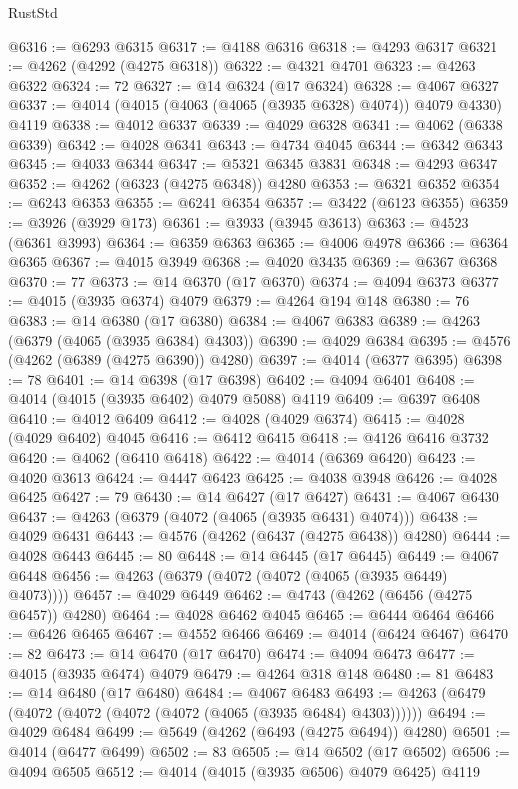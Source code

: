 \begin{lexlean}{RustStd}
\begin{coremodule}
@6316 := @6293 @6315
@6317 := @4188 @6316
@6318 := @4293 @6317
@6321 := @4262 (@4292 (@4275 @6318))
@6322 := @4321 @4701
@6323 := @4263 @6322
@6324 := 72
@6327 := @14 @6324 (@17 @6324)
@6328 := @4067 @6327
@6337 := @4014 (@4015 (@4063 (@4065 (@3935 @6328) @4074)) @4079 @4330) @4119
@6338 := @4012 @6337
@6339 := @4029 @6328
@6341 := @4062 (@6338 @6339)
@6342 := @4028 @6341
@6343 := @4734 @4045
@6344 := @6342 @6343
@6345 := @4033 @6344
@6347 := @5321 @6345 @3831
@6348 := @4293 @6347
@6352 := @4262 (@6323 (@4275 @6348)) @4280
@6353 := @6321 @6352
@6354 := @6243 @6353
@6355 := @6241 @6354
@6357 := @3422 (@6123 @6355)
@6359 := @3926 (@3929 @173)
@6361 := @3933 (@3945 @3613)
@6363 := @4523 (@6361 @3993)
@6364 := @6359 @6363
@6365 := @4006 @4978
@6366 := @6364 @6365
@6367 := @4015 @3949
@6368 := @4020 @3435
@6369 := @6367 @6368
@6370 := 77
@6373 := @14 @6370 (@17 @6370)
@6374 := @4094 @6373
@6377 := @4015 (@3935 @6374) @4079
@6379 := @4264 @194 @148
@6380 := 76
@6383 := @14 @6380 (@17 @6380)
@6384 := @4067 @6383
@6389 := @4263 (@6379 (@4065 (@3935 @6384) @4303))
@6390 := @4029 @6384
@6395 := @4576 (@4262 (@6389 (@4275 @6390)) @4280)
@6397 := @4014 (@6377 @6395)
@6398 := 78
@6401 := @14 @6398 (@17 @6398)
@6402 := @4094 @6401
@6408 := @4014 (@4015 (@3935 @6402) @4079 @5088) @4119
@6409 := @6397 @6408
@6410 := @4012 @6409
@6412 := @4028 (@4029 @6374)
@6415 := @4028 (@4029 @6402) @4045
@6416 := @6412 @6415
@6418 := @4126 @6416 @3732
@6420 := @4062 (@6410 @6418)
@6422 := @4014 (@6369 @6420)
@6423 := @4020 @3613
@6424 := @4447 @6423
@6425 := @4038 @3948
@6426 := @4028 @6425
@6427 := 79
@6430 := @14 @6427 (@17 @6427)
@6431 := @4067 @6430
@6437 := @4263 (@6379 (@4072 (@4065 (@3935 @6431) @4074)))
@6438 := @4029 @6431
@6443 := @4576 (@4262 (@6437 (@4275 @6438)) @4280)
@6444 := @4028 @6443
@6445 := 80
@6448 := @14 @6445 (@17 @6445)
@6449 := @4067 @6448
@6456 := @4263 (@6379 (@4072 (@4072 (@4065 (@3935 @6449) @4073))))
@6457 := @4029 @6449
@6462 := @4743 (@4262 (@6456 (@4275 @6457)) @4280)
@6464 := @4028 @6462 @4045
@6465 := @6444 @6464
@6466 := @6426 @6465
@6467 := @4552 @6466
@6469 := @4014 (@6424 @6467)
@6470 := 82
@6473 := @14 @6470 (@17 @6470)
@6474 := @4094 @6473
@6477 := @4015 (@3935 @6474) @4079
@6479 := @4264 @318 @148
@6480 := 81
@6483 := @14 @6480 (@17 @6480)
@6484 := @4067 @6483
@6493 := @4263 (@6479 (@4072 (@4072 (@4072 (@4072 (@4065 (@3935 @6484) @4303))))))
@6494 := @4029 @6484
@6499 := @5649 (@4262 (@6493 (@4275 @6494)) @4280)
@6501 := @4014 (@6477 @6499)
@6502 := 83
@6505 := @14 @6502 (@17 @6502)
@6506 := @4094 @6505
@6512 := @4014 (@4015 (@3935 @6506) @4079 @6425) @4119

\end{coremodule}
\end{lexlean}
